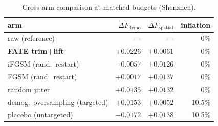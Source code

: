\begin{table}[t]
\centering
\caption{Cross-arm comparison at matched budgets (Shenzhen).}
\label{tab:baselines}
\footnotesize
\setlength{\tabcolsep}{4pt}
\begin{tabular}{lrrr}
\toprule
arm & $\Delta F_{\mathrm{demo}}$ & $\Delta F_{\mathrm{spatial}}$ & inflation \\
\midrule
raw (reference) & --- & --- & 0\% \\
\textbf{FATE trim+lift} & $\mathbf{+0.0226}$ & $+0.0061$ & 0\% \\
iFGSM (rand.\ restart) & $-0.0057$ & $+0.0126$ & 0\% \\
FGSM (rand.\ restart) & $+0.0017$ & $+0.0137$ & 0\% \\
random jitter & $+0.0135$ & $+0.0132$ & 0\% \\
demog.\ oversampling (targeted) & $+0.0153$ & $+0.0052$ & 10.5\% \\
\quad placebo (untargeted) & $-0.0172$ & $+0.0138$ & 10.5\% \\
\bottomrule
\end{tabular}
\end{table}

